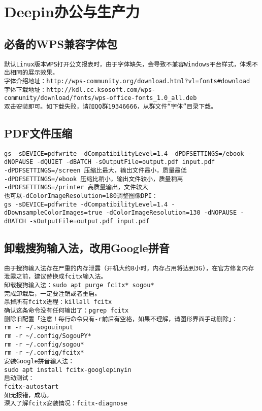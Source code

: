 \documentclass[a4paper,fontset=fandol,zihao=-4,linespread=1.2,oneside]{ctexbook}
\begin{document}
\chapter{Deepin办公与生产力}

\section{必备的WPS兼容字体包}
\begin{lstlisting}
默认Linux版本WPS打开公文报表时，由于字体缺失，会导致不兼容Windows平台样式，体现不出相同的展示效果。
字体介绍地址：http://wps-community.org/download.html?vl=fonts#download
字体下载地址：http://kdl.cc.ksosoft.com/wps-community/download/fonts/wps-office-fonts_1.0_all.deb
双击安装即可。如下载失败，请加QQ群19346666，从群文件“字体”目录下载。
\end{lstlisting}

\section{PDF文件压缩}
\begin{lstlisting}
gs -sDEVICE=pdfwrite -dCompatibilityLevel=1.4 -dPDFSETTINGS=/ebook -dNOPAUSE -dQUIET -dBATCH -sOutputFile=output.pdf input.pdf
-dPDFSETTINGS=/screen 压缩比最大，输出文件最小，质量最低
-dPDFSETTINGS=/ebook 压缩比稍小，输出文件较小，质量稍高
-dPDFSETTINGS=/printer 高质量输出，文件较大
也可以-dColorImageResolution=180调整图像DPI：
gs -sDEVICE=pdfwrite -dCompatibilityLevel=1.4 -dDownsampleColorImages=true -dColorImageResolution=130 -dNOPAUSE -dBATCH -sOutputFile=output.pdf input.pdf
\end{lstlisting}

\section{卸载搜狗输入法，改用Google拼音}
\begin{lstlisting}
由于搜狗输入法存在严重的内存泄露（开机大约8小时，内存占用将达到3G)，在官方修复内存泄露之前，建议替换成fcitx输入法。
卸载搜狗输入法：sudo apt purge fcitx* sogou*
完成卸载后，一定要注销或者重启。
杀掉所有fcitx进程：killall fcitx
确认这条命令没有任何输出了：pgrep fcitx
删除旧配置「注意！每行命令只有-r前后有空格，如果不理解，请图形界面手动删除」：
rm -r ~/.sogouinput
rm -r ~/.config/SogouPY*
rm -r ~/.config/sogou*
rm -r ~/.config/fcitx*
安装Google拼音输入法：
sudo apt install fcitx-googlepinyin
启动测试：
fcitx-autostart
如无报错，成功。
深入了解fcitx安装情况：fcitx-diagnose
\end{lstlisting}
\end{document}
